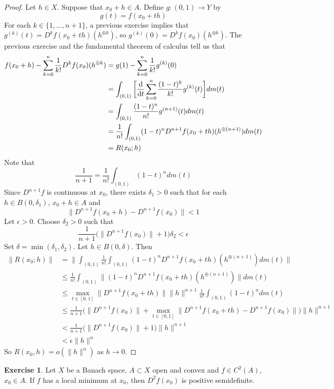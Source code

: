 \documentclass[12pt]{amsart}
\theoremstyle{definition}
\newtheorem{ex}[definition]{Exercise}
\newcommand{\del}{\delta}
\newcommand{\ep}{\epsilon}
\newcommand{\lex}[1]{\label{ex:#1}}
\begin{document}
	\begin{proof}
	Let $h \in X$. Suppose that $x_0 + h \in A$. Define $g: (0,1) \rightarrow Y$ by 
	$$g(t) = f(x_0 +t h)$$ 
	For each $k \in \{1, \dots, n+1\}$, a previous exercise implies that $g^{(k)}(t) = D^kf(x_0 + th)(h^{\oplus k})$, so $g^{(k)}(0) = D^kf(x_0)(h^{\oplus k})$. The previous exercise and the fundamental theorem of calculus tell us that 
	\begin{align*}
	f(x_0 +h) - \sum_{k=0}^{n} \frac{1}{k!}D^kf(x_0)(h^{\oplus k})
	&= g(1) - \sum_{k=0}^{n} \frac{1}{k!}g^{(k)}(0)\\
	&= \int_{(0,1)} \bigg [\dv{t} \sum_{k=0}^{n} \frac{(1-t)^k}{k!}g^{(k)}(t)\bigg ] dm(t) \\
	&= \int_{(0,1)} \frac{(1-t)^{n}}{n!}g^{(n+1)}(t) dm(t) \\
	&= \frac{1}{n!}\int_{(0,1)} (1-t)^{n}D^{n+1}f(x_0 + th)(h^{\oplus (n+1)})d m(t) \\
	&= R(x_0;h)
	\end{align*}	
	Note that $$\frac{1}{n+1} = \frac{1}{n!}\int_{(0,1)} (1-t)^{n} dm(t)$$ 
	Since $D^{n+1}f$ is continuous at $x_0$, there exists $\del_1 >0$ such that for each $h \in B(0, \del_1)$, $x_0 + h \in A$ and 
	$$\|D^{n+1} f(x_0+h) - D^{n+1}f(x_0)\| < 1 $$  
	Let $\ep >0$. Choose $\del_2 >0$ such that $$\frac{1}{n+1} \bigg( \|D^{n+1}f(x_0 )\|  +  1 \bigg) \del_2 < \ep$$ Set $\del = \min(\del_1, \del_2)$. Let $h \in B(0, \del)$. Then
	\begin{align*}
	\|R(x_0;h)\| 
	&= \bigg \| \int_{(0,1)} \frac{1}{n!}\int_{(0,1)} (1-t)^{n}D^{n+1}f(x_0 + th)(h^{\oplus (n+1)})d m(t) \bigg\| \\
	&\leq \frac{1}{n!}\int_{(0,1)} \|(1-t)^{n}D^{n+1}f(x_0 + th)(h^{\oplus (n+1)}) \|dm(t)\\
	&\leq \max_{t \in [0,1]}\|D^{n+1}f(x_0 + th)\| \|h\|^{n+1} \frac{1}{n!}\int_{(0,1)} (1-t)^{n} dm(t)  \\
	&\leq \frac{1}{n+1}  \bigg(\|D^{n+1}f(x_0 )\| +  \max_{t \in [0,1]} \|D^{n+1} f(x_0+th) - D^{n+1}f(x_0)\| \bigg)\|h\|^{n+1}  \\
	&< \frac{1}{n+1}\bigg(\|D^{n+1}f(x_0 )\|  +  1 \bigg)\|h\|^{n+1}  \\
	&<\ep \|h\|^n
	\end{align*}
	So $R(x_0, h) = o(\|h\|^{n})$ as $h \rightarrow 0$.
	\end{proof}
	
	\begin{ex} \lex{}
	Let $X$ be a Banach space, $A \subset X$ open and convex and $f\in C^{2}(A)$, $x_0 \in A$. If $f$ has a local minimum at $x_0$, then $D^2f(x_0)$ is positive semidefinite.   
	\end{ex}
	
\end{document}
